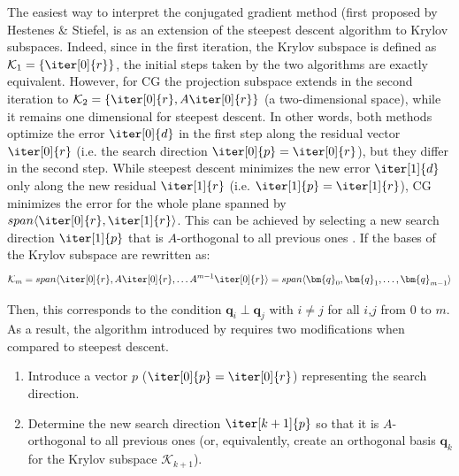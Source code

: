 The easiest way to interpret the conjugated gradient method (first proposed by Hestenes \& Stiefel,  \cite{hestenes_methods_1952} is as an extension of the steepest descent algorithm to Krylov subspaces. Indeed, since in the first iteration, the Krylov subspace is defined as $\mathcal{K}_1=\{\iter[0]{r}\}$, the initial steps taken by the two algorithms are exactly equivalent. However, for CG the projection subspace extends in the second iteration to $\mathcal{K}_2=\{\iter[0]{r}, A\iter[0]{r}\}$ (a two-dimensional space), while it remains one dimensional for steepest descent. In other words, both methods optimize the error $\iter[0]{d}$ in the first step along the residual vector $\iter[0]{r}$ (i.e. the search direction $\iter[0]{p}=\iter[0]{r}$), but they differ in the second step. While steepest descent minimizes the new error $\iter[1]{d}$ only along the new residual $\iter[1]{r}$ (i.e. $\iter[1]{p}=\iter[1]{r}$), CG minimizes the error for the whole plane spanned by $span\langle\iter[0]{r}, \iter[1]{r}\rangle$. This can be achieved by selecting a new search direction $\iter[1]{p}$ that is $A$-orthogonal to all previous ones \cite{trefethen_numerical_1997}. If the bases of the Krylov subspace are rewritten as:
\begin{equation}
    \mathcal{K}_m = span\langle\iter[0]{r}, A\iter[0]{r}, \dots A^{m-1}\iter[0]{r}\rangle = span\langle\bm{q}_0, \bm{q}_1, \dots, \bm{q}_{m-1}\rangle
\end{equation}

\noindent Then, this corresponds to the condition $\bm{q}_i \perp \bm{q}_j$ with $i\neq j$ for all $i$,$j$ from $0$ to $m$. As a result, the algorithm introduced by \cite{hestenes_methods_1952} requires two modifications when compared to steepest descent.
\begin{enumerate}
    \item Introduce a vector $p$ ($\iter[0]{p} = \iter[0]{r}$) representing the search direction.
    \item Determine the new search direction $\iter[k+1]{p}$ so that it is $A$-orthogonal to all previous ones (or, equivalently, create an orthogonal basis $\bm{q}_{k}$ for the Krylov subspace $\mathcal{K}_{k+1}$).
\end{enumerate}

